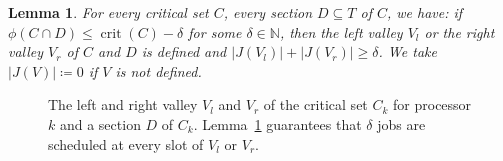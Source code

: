 \documentclass[a4paper]{article}
\DeclareMathOperator{\crit}{crit}
\newtheorem{lemma}[theorem]{Lemma}
\begin{document}
\begin{lemma}\label{lemma:valley}
  For every critical set $C$, every section $D \subseteq T$ of $C$, we have: if $\phi(C \cap D) \leq \crit(C) - \delta$ for some $\delta \in \mathbb{N}$, then the left valley $V_l$ or the right valley $V_r$ of $C$ and $D$ is defined and $|J(V_l)| + |J(V_r)| \geq \delta$.
  We take $|J(V)| \coloneqq 0$ if $V$ is not defined.
\end{lemma}
\begin{figure}[H]
  \centering
  
  \caption{The left and right valley $V_l$ and $V_r$ of the critical set $C_k$ for processor $k$ and a section $D$ of $C_k$.
  Lemma~\ref{lemma:valley} guarantees that $\delta$ jobs are scheduled at every slot of $V_l$ or $V_r$.}\label{fig:left_right_valleys}
\end{figure}
\end{document}
